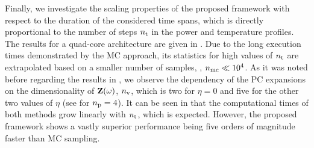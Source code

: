 Finally, we investigate the scaling properties of the proposed framework with respect to the duration of the considered time spans, which is directly proportional to the number of steps ${n_\text{t}}$ in the power and temperature profiles.
The results for a quad-core architecture are given in .
Due to the long execution times demonstrated by the MC approach, its statistics for high values of ${n_\text{t}}$ are extrapolated based on a smaller number of samples, \ie, ${n_\text{mc}} \ll 10^4$.
As it was noted before regarding the results in , we observe the dependency of the PC expansions on the dimensionality of $\mathbf{Z}(\omega)$, ${n_\text{v}}$, which is two for $\eta = 0$ and five for the other two values of $\eta$ (see  for ${n_\text{p}} = 4$).
It can be seen in  that the computational times of both methods grow linearly with ${n_\text{t}}$, which is expected.
However, the proposed framework shows a vastly superior performance being five orders of magnitude faster than MC sampling.
